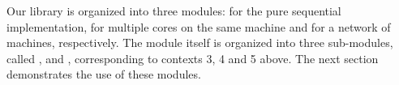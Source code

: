 \documentclass[a4paper,12pt]{article}
\begin{document}
Our library is organized into three modules:  for the
pure sequential implementation,  for multiple cores on the
same machine and  for a network of machines, respectively.
The  module itself is organized into three sub-modules,
called ,  and ,
corresponding to contexts 3, 4 and 5 above. 
The next section demonstrates the use of these modules.

\end{document}
